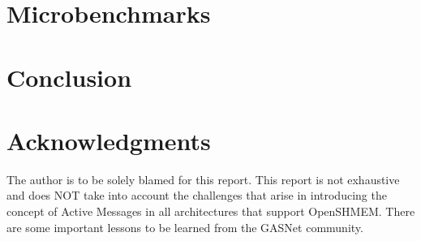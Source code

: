 \documentclass{llncs}
\begin{document}
\section{Microbenchmarks}
\label{sec:microbench}

\section{Conclusion}
\label{sec:conclusion}

\section{Acknowledgments}
The author is to be solely blamed for this report. 
This report is not exhaustive and does NOT take 
into account the challenges that arise in 
introducing the concept of Active Messages in all 
architectures that support OpenSHMEM. There are 
some important lessons to be learned from the 
GASNet community.




\end{document}
